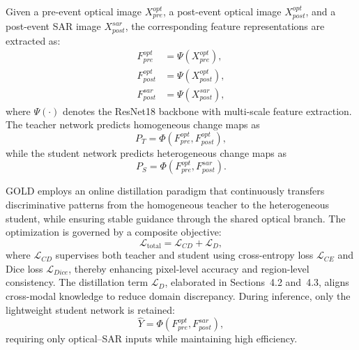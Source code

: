 \documentclass[a4paper,fleqn]{cas-dc}
\begin{document}
Given a pre-event optical image $X_{pre}^{opt}$, a post-event optical image $X_{post}^{opt}$, and a post-event SAR image $X_{post}^{sar}$, the corresponding feature representations are extracted as:
\begin{equation}
\begin{split}
F_{pre}^{opt} &= \Psi\!\left(X_{pre}^{opt}\right), \\
F_{post}^{opt} &= \Psi\!\left(X_{post}^{opt}\right), \\
F_{post}^{sar} &= \Psi\!\left(X_{post}^{sar}\right),
\end{split}
\end{equation}
where $\Psi(\cdot)$ denotes the ResNet18 backbone with multi-scale feature extraction. 
The teacher network predicts homogeneous change maps as
\begin{equation}
P_T = \Phi\!\left(F^{opt}_{pre}, F^{opt}_{post}\right),
\end{equation}
while the student network predicts heterogeneous change maps as
\begin{equation}
P_S = \Phi\!\left(F^{opt}_{pre}, F^{sar}_{post}\right).
\end{equation}

GOLD employs an online distillation paradigm that continuously transfers discriminative patterns from the homogeneous teacher to the heterogeneous student, while ensuring stable guidance through the shared optical branch. The optimization is governed by a composite objective:
\begin{equation}
\mathcal{L}_{\text{total}} = \mathcal{L}_{CD} + \mathcal{L}_{D},
\end{equation}
where $\mathcal{L}_{CD}$ supervises both teacher and student using cross-entropy loss $\mathcal{L}_{CE}$ and Dice loss $\mathcal{L}_{Dice}$, thereby enhancing pixel-level accuracy and region-level consistency. The distillation term $\mathcal{L}_{D}$, elaborated in Sections~4.2 and~4.3, aligns cross-modal knowledge to reduce domain discrepancy. During inference, only the lightweight student network is retained:
\begin{equation}
\hat{Y}=\Phi\!\left(F_{pre}^{opt}, F_{post}^{sar}\right),
\end{equation}
requiring only optical–SAR inputs while maintaining high efficiency.
\end{document}
